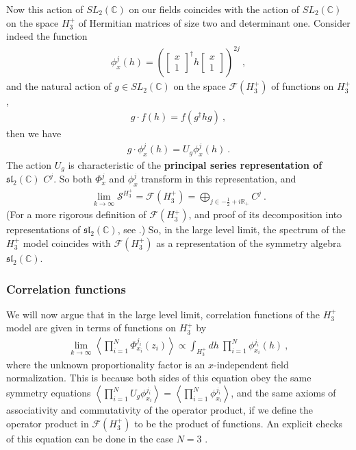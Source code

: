 \documentclass[12pt, a4paper, notitlepage, twoside]{report}
\numberwithin{equation}{section}
\theoremstyle{break}
\begin{document}
Now this action of $SL_2({\mathbb{C}})$ on our fields coincides with the action of $SL_2({\mathbb{C}})$ on the space $H_3^+$ of Hermitian matrices of size two and determinant one.
Consider indeed the function
\begin{align}
 \phi^j_{x}(h) = \left(\begin{bmatrix}
                                x \\ 1
                               \end{bmatrix}^\dagger 
h \begin{bmatrix}
   x \\ 1 
  \end{bmatrix}
 \right)^{2j}\ ,
\end{align}
and the natural action of $g\in SL_2({\mathbb{C}})$ on the space $\mathcal{F}(H_3^+)$ of functions on $H_3^+$,
\begin{align}
 g\cdot f(h) = f(g^\dagger h g)\ ,
\end{align}
then we have 
\begin{align}
 g\cdot \phi^j_{x}(h) = U_g \phi^j_{x}(h)\ .
\end{align}
The action $U_g$ is characteristic of the \textbf{\boldmath principal series representation of $\mathfrak{sl}_2({\mathbb{C}})$} $C^j$. 
So both $\Phi^j_x$ and $\phi^j_x$ transform in this representation, and 
\begin{align}
 \underset{k\to\infty}{\lim} \mathcal{S}^{H_3^+} =  \mathcal{F}(H_3^+) = \bigoplus_{j\in -\frac12+i{\mathbb{R}}_+} C^j\ .
\end{align}
(For a more rigorous definition of $\mathcal{F}(H_3^+)$, and proof of its decomposition into representations of $\mathfrak{sl}_2({\mathbb{C}})$, see \cite{tes97b}.)
So, in the large level limit, the spectrum of the $H_3^+$ model coincides with $\mathcal{F}(H_3^+)$ as a representation of the symmetry algebra $\mathfrak{sl}_2({\mathbb{C}})$. 

\subsubsection{Correlation functions}

We will now argue that in the large level limit, correlation functions of the $H_3^+$ model are given in terms of functions on $H_3^+$ by 
\begin{align}
 \underset{k\to \infty}{\lim} \left\langle \prod_{i=1}^N \Phi^{j_i}_{x_i}(z_i)\right\rangle \propto \int_{H_3^+} dh\ \prod_{i=1}^N \phi^{j_i}_{x_i}(h)\ , 
\end{align}
where the unknown proportionality factor is an $x$-independent field normalization.
This is because both sides of this equation obey the same symmetry equations $\left<\prod_{i=1}^N U_g \phi^{j_i}_{x_i} \right> = \left<\prod_{i=1}^N \phi^{j_i}_{x_i} \right>$, and the same axioms of associativity and commutativity of the operator product, if we define the operator product in $\mathcal{F}(H_3^+)$ to be the product of functions. 
An explicit checks of this equation can be done in the case $N=3$ \cite{tes97b}.
\end{document}
